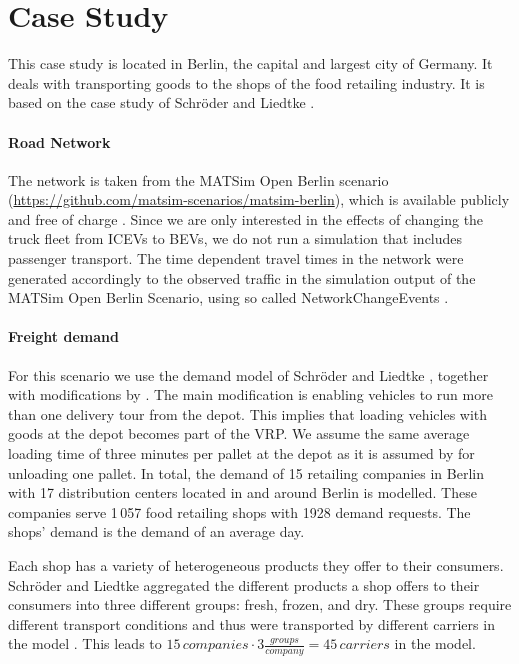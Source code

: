 \section{Case Study}
\label{sec:caseStudy}
This case study is located in Berlin, the capital and largest city of Germany. 
It deals with transporting goods to the shops of the food retailing industry. 
It is based on the case study of Schröder and Liedtke \cite{SchroederLiedtke2014FoodDistributionBerlin}.

\paragraph*{Road Network}
\label{network}
The network is taken from the MATSim Open Berlin scenario (\url{https://github.com/matsim-scenarios/matsim-berlin}), which is available publicly and free of charge \cite{ZiemkeEtAl2019OpenBerlinScenario}.
Since we are only interested in the effects of changing the truck fleet from ICEVs to BEVs, we do not run a simulation that includes passenger transport. 
The time dependent travel times in the network were generated accordingly to the observed traffic in the simulation output of the MATSim Open Berlin Scenario, using so called NetworkChangeEvents \cite{DataContainers2015InBook}.

\paragraph*{Freight demand}
\label{sec:demand}
For this scenario we use the demand model of Schröder and Liedtke \cite{SchroederLiedtke2014FoodDistributionBerlin}, together with modifications by \cite{MartinsTurnerNagel2019FreightMultipleToursABMTrans}. 
The main modification is enabling vehicles to run more than one delivery tour from the depot.
This implies that loading vehicles with goods at the depot becomes part of the VRP.
We assume the same average loading time of three minutes per pallet at the depot as it is assumed by \cite{SchroederLiedtke2014FoodDistributionBerlin} for unloading one pallet.
In total, the demand of 15 retailing companies in Berlin with 17 distribution centers located in and around Berlin is modelled. 
These companies serve 1\,057 food retailing shops with 1928 demand requests. 
The shops' demand is the demand of an average day.

Each shop has a variety of heterogeneous products they offer to their consumers. 
Schröder and Liedtke aggregated the different products a shop offers to their consumers into three different groups: fresh, frozen, and dry. 
These groups require different transport conditions and thus were transported by different carriers in the model \cite{SchroederLiedtke2014FoodDistributionBerlin}.
This leads to  $15 \, {\textit{companies}} \cdot 3 \frac{\textit{groups}}{\textit{company}} = 45 \, {\textit{carriers}}$  in the model. 

